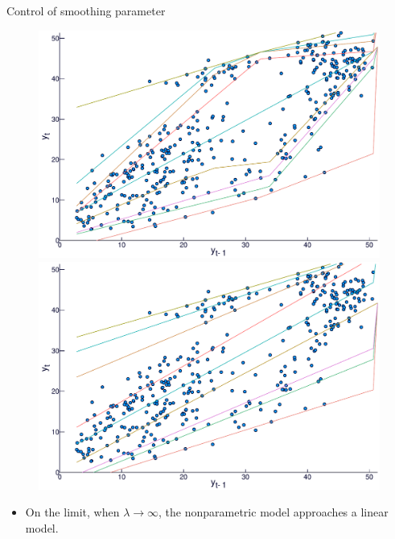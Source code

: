 \documentclass[11pt]{beamer}
\begin{document}
\begin{frame}{Control of smoothing parameter}

\begin{figure}
\centering
\begin{minipage}[t]{\linewidth}
\centering
\begin{minipage}[t]{0.45\linewidth}
\centering     \includegraphics[width=\textwidth]{Images/icaraizinho-crossing-10}
\end{minipage}
\begin{minipage}[t]{0.45\linewidth}
\centering     \includegraphics[width=\textwidth]{Images/icaraizinho-crossing-200}
\end{minipage}
\end{minipage}
\end{figure}

\begin{itemize}

\item
On the limit, when \(\lambda \rightarrow \infty\), the nonparametric
model approaches a linear model.
\end{itemize}

\end{frame}
\end{document}
